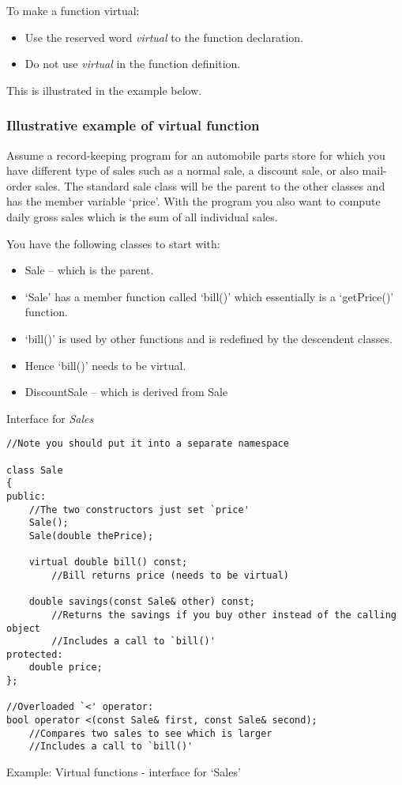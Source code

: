 To make a function virtual:
\begin{itemize}
	\item Use the reserved word \emph{virtual} to the function declaration.
	\item Do not use \emph{virtual} in the function definition.
\end{itemize}

This is illustrated in the example below.

\subsubsection*{Illustrative example of virtual function}
Assume a record-keeping program for an automobile parts store for which you have different type
of sales such as a normal sale, a discount sale, or also mail-order sales. The standard sale class
will be the parent to the other classes and has the member variable `price'. With the program you
also want to compute daily gross sales which is the sum of all individual sales.

You have the following classes to start with:
\begin{itemize}
	\item Sale -- which is the parent.
		\item `Sale' has a member function called `bill()' which essentially is a `getPrice()' 
		function.
		\item `bill()' is used by other functions and is redefined by the descendent classes.
		\item Hence `bill()' needs to be virtual.
	\item DiscountSale -- which is derived from Sale
\end{itemize}

\noindent
Interface for \emph{Sales}
\begin{listing}[H]
\begin{verbatim}
//Note you should put it into a separate namespace

class Sale
{
public:
	//The two constructors just set `price'
	Sale();
	Sale(double thePrice);

	virtual double bill() const;
		//Bill returns price (needs to be virtual)

	double savings(const Sale& other) const;
		//Returns the savings if you buy other instead of the calling object
		//Includes a call to `bill()'
protected:
	double price;
};

//Overloaded `<' operator:
bool operator <(const Sale& first, const Sale& second);
	//Compares two sales to see which is larger
	//Includes a call to `bill()'
\end{verbatim}
\caption{Example: Virtual functions - interface for `Sales'}
\label{source_code_1}
\end{listing}


